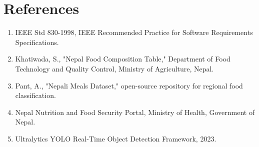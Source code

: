 \documentclass[11pt,a4paper]{article}
\begin{document}
\section{References}
\begin{enumerate}[leftmargin=*]
  \item IEEE Std 830-1998, IEEE Recommended Practice for Software Requirements Specifications.
  \item Khatiwada, S., "Nepal Food Composition Table," Department of Food Technology and Quality Control, Ministry of Agriculture, Nepal.
  \item Pant, A., "Nepali Meals Dataset," open-source repository for regional food classification.
  \item Nepal Nutrition and Food Security Portal, Ministry of Health, Government of Nepal.
  \item Ultralytics YOLO Real-Time Object Detection Framework, 2023.
\end{enumerate}
\end{document}
